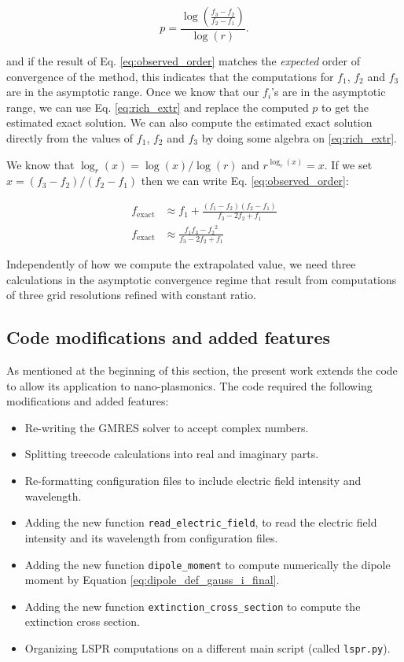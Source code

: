 \begin{equation} \label{eq:observed_order}
   p = \frac{\log \left( \frac{f_3 - f_2}{f_2-f_1} \right)}{\log (r)}.
\end{equation}
   
and if the result of Eq. \eqref{eq:observed_order} matches the \textit{expected} order of convergence
of the method, this indicates that the computations for $f_1$, $f_2$ and $f_3$ are in the asymptotic range.
Once we know that our $f_i$'s are in the asymptotic range, we can use Eq. \eqref{eq:rich_extr} and replace
the computed $p$ to get the estimated exact solution. We can also compute the estimated exact solution
directly from the values of $f_1$, $f_2$ and $f_3$ by doing some algebra on \eqref{eq:rich_extr}.

We know that $\log_r(x) = \log(x)/\log(r)$ and $r^{\log_r(x)} = x$. If we set $x = (f_3 - f_2)/(f_2 -f_1)$ 
then we can write Eq. \eqref{eq:observed_order}:

\begin{align} \label{eq:rich_extr2}
   f_{\text{exact}} &\approx f_1 + \frac{(f_1 - f_2)(f_2 -f_1)}{f_3-2f_2+f_1} \\
   f_{\text{exact}} &\approx \frac{f_1f_3 -{f_2}^2}{f_3-2f_2+f_1}
\end{align} 

Independently of how we compute the extrapolated value, we need three
calculations in the asymptotic convergence regime that result from computations
of three grid resolutions refined with constant ratio.


\subsection{Code modifications and added features} \label{sec:code_imp}

As mentioned at the beginning of this section, the present work extends the \pygbe code
to allow its application to nano-plasmonics. 
The code required the following modifications and added features:

\begin{itemize}
    \item Re-writing the GMRES solver to accept complex numbers. 
    \item Splitting treecode calculations into real and imaginary parts.
    \item Re-formatting configuration files to include electric field intensity and  wavelength.
    \item Adding the new function \texttt{read\_electric\_field}, to read the electric field intensity and its wavelength from configuration files.
    \item Adding the new function \texttt{dipole\_moment} to compute numerically the dipole moment by Equation \eqref{eq:dipole_def_gauss_i_final}.
    \item Adding the new function \texttt{extinction\_cross\_section} to compute the extinction cross section.
    \item Organizing LSPR computations on a different main script (called \texttt{lspr.py}).
\end{itemize}

